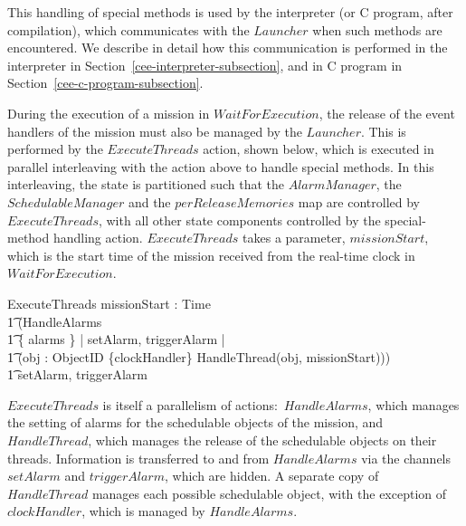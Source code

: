 This handling of special methods is used by the interpreter (or C
program, after compilation), which communicates with the $Launcher$
when such methods are encountered.
We describe in detail how this communication is performed in the
interpreter in Section~\ref{cee-interpreter-subsection}, and in C
program in Section~\ref{cee-c-program-subsection}.

During the execution of a mission in $WaitForExecution$, the release
of the event handlers of the mission must also be managed by the
$Launcher$.
This is performed by the $ExecuteThreads$ action, shown below, which
is executed in parallel interleaving with the action above to handle
special methods.
In this interleaving, the state is partitioned such that the
$AlarmManager$, the $SchedulableManager$ and the $perReleaseMemories$
map are controlled by $ExecuteThreads$, with all other state
components controlled by the special-method handling action.
$ExecuteThreads$ takes a parameter, $missionStart$, which
is the start time of the mission received from the real-time clock in
$WaitForExecution$.
\begin{circusaction}
  ExecuteThreads \circdef \circval missionStart : Time \circspot \\
  \t1 (HandleAlarms \\
  \t1 {} \lpar \{ alarms \} | \lchanset setAlarm, triggerAlarm \rchanset | \emptyset \rpar {} \\
  \t1 (\Interleave obj : ObjectID \setminus \{clockHandler\} \linter \emptyset \rinter \circspot HandleThread(obj, missionStart))) \\
  \t1 \circhide \lchanset setAlarm, triggerAlarm \rchanset
\end{circusaction}
$ExecuteThreads$ is itself a parallelism of actions:~$HandleAlarms$,
which manages the setting of alarms for the schedulable objects of the
mission, and $HandleThread$, which manages the release of the
schedulable objects on their threads.
Information is transferred to and from $HandleAlarms$ via the channels
$setAlarm$ and $triggerAlarm$, which are hidden.
A separate copy of $HandleThread$ manages each possible schedulable
object, with the exception of $clockHandler$, which is managed by
$HandleAlarms$.

